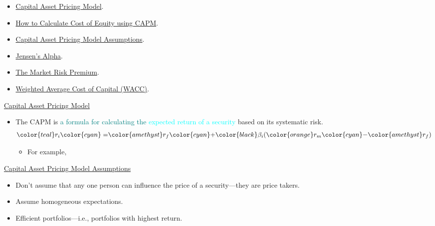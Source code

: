 \begin{YTB_vids}
\begin{itemize}
	\item	\href{https://www.youtube.com/watch?v=fDz_DgDJD5g&list=PL_KGEFWqEaTBbYDupRektHIMG0G9u-Ru-&index=58&t=0s}{Capital Asset Pricing Model}.
	\item	\href{https://www.youtube.com/watch?v=JyUBm9M7Wyw&list=PL_KGEFWqEaTBbYDupRektHIMG0G9u-Ru-&index=58}{How to Calculate Cost of Equity using CAPM}.
	\item	\href{https://www.youtube.com/watch?v=Lvhu1w0gsvc&list=PL_KGEFWqEaTBbYDupRektHIMG0G9u-Ru-&index=59}{Capital Asset Pricing Model Assumptions}.
	\item	\href{https://www.youtube.com/watch?v=fo0Ba9-GCts&list=PL_KGEFWqEaTBbYDupRektHIMG0G9u-Ru-&index=60}{Jensen's Alpha}.
	\item	\href{https://www.youtube.com/watch?v=zYyzxXEO84Q&list=PL_KGEFWqEaTBbYDupRektHIMG0G9u-Ru-&index=63&t=0s}{The Market Risk Premium}.
	\item	\href{https://www.youtube.com/watch?v=46oLXwClvkw&list=PL_KGEFWqEaTBbYDupRektHIMG0G9u-Ru-&index=35}{Weighted Average Cost of Capital (WACC)}.
\end{itemize}
\end{YTB_vids}

\begin{YTB_SUMM}[label = {SQ-BASICS-ML-INTRO}]{\href{https://www.youtube.com/watch?v=fDz_DgDJD5g&list=PL_KGEFWqEaTBbYDupRektHIMG0G9u-Ru-&index=58&t=0s}{Capital Asset Pricing Model}}
\begin{itemize}
	\item	The CAPM is \textcolor{teal}{a formula for calculating the} \textcolor{cyan}{expected return of a security} \textcolor{amethyst}{based on its systematic risk}.
		\begin{align*}
			{\color{teal}r_{i}}	
			&{\color{cyan}=}	{\color{amethyst}r_{f}} {\color{cyan}+} {\color{black}\beta_{i}} ({\color{orange}r_{m}} {\color{cyan}-} {\color{amethyst}r_{f}})
		\end{align*}
		\begin{itemize}
		\item	For example, 
		\end{itemize}
\end{itemize}
\end{YTB_SUMM}

\begin{YTB_SUMM}[label = {SQ-BASICS-ML-INTRO}]{\href{https://www.youtube.com/watch?v=Lvhu1w0gsvc&list=PL_KGEFWqEaTBbYDupRektHIMG0G9u-Ru-&index=59}{Capital Asset Pricing Model Assumptions}}
\begin{itemize}
	\item	Don't assume that any one person can influence the price of a security---they are price takers.
	\item	Assume homogeneous expectations.
	\item	Efficient portfolios---i.e., portfolios with highest return.
\end{itemize}
\end{YTB_SUMM}




